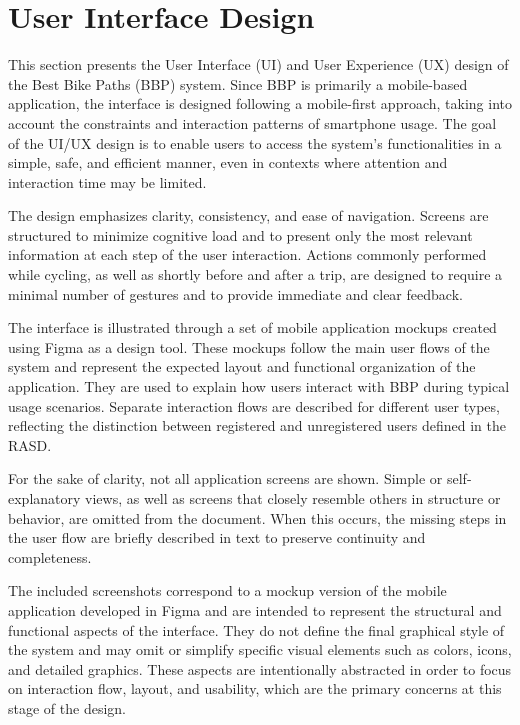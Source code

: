\chapter{User Interface Design}
\label{chap:user-interface-design}%

\par This section presents the User Interface (UI) and User Experience (UX) design of
the Best Bike Paths (BBP) system. Since BBP is primarily a mobile-based application,
the interface is designed following a mobile-first approach, taking into account the
constraints and interaction patterns of smartphone usage. The goal of the UI/UX
design is to enable users to access the system’s functionalities in a simple, safe,
and efficient manner, even in contexts where attention and interaction time may be
limited.

\par The design emphasizes clarity, consistency, and ease of navigation. Screens are
structured to minimize cognitive load and to present only the most relevant
information at each step of the user interaction. Actions commonly performed while
cycling, as well as shortly before and after a trip, are designed to require a minimal
number of gestures and to provide immediate and clear feedback.

\par The interface is illustrated through a set of mobile application mockups created
using Figma as a design tool. These mockups follow the main user flows of the system
and represent the expected layout and functional organization of the application.
They are used to explain how users interact with BBP during typical usage scenarios.
Separate interaction flows are described for different user types, reflecting the
distinction between registered and unregistered users defined in the RASD.

\par For the sake of clarity, not all application screens are shown. Simple or
self-explanatory views, as well as screens that closely resemble others in structure
or behavior, are omitted from the document. When this occurs, the missing steps in
the user flow are briefly described in text to preserve continuity and completeness.

\par The included screenshots correspond to a mockup version of the mobile application
developed in Figma and are intended to represent the structural and functional aspects
of the interface. They do not define the final graphical style of the system and may
omit or simplify specific visual elements such as colors, icons, and detailed
graphics. These aspects are intentionally abstracted in order to focus on interaction
flow, layout, and usability, which are the primary concerns at this stage of the
design.


